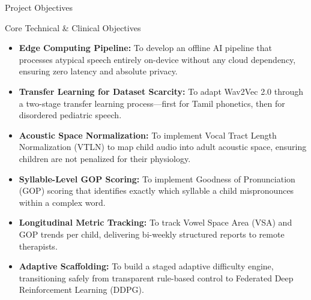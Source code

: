\documentclass[aspectratio=169, 11pt, xcolor=table]{beamer}
\begin{document}
\begin{frame}{Project Objectives}
    \begin{block}{Core Technical \& Clinical Objectives}
        \small
        \begin{itemize}
            \setlength{\itemsep}{6pt}
            \item \textbf{Edge Computing Pipeline:} To develop an offline AI pipeline that processes atypical speech entirely on-device without any cloud dependency, ensuring zero latency and absolute privacy.
            \item \textbf{Transfer Learning for Dataset Scarcity:} To adapt Wav2Vec 2.0 through a two-stage transfer learning process—first for Tamil phonetics, then for disordered pediatric speech.
            \item \textbf{Acoustic Space Normalization:} To implement Vocal Tract Length Normalization (VTLN) to map child audio into adult acoustic space, ensuring children are not penalized for their physiology.
            \item \textbf{Syllable-Level GOP Scoring:} To implement Goodness of Pronunciation (GOP) scoring that identifies exactly which syllable a child mispronounces within a complex word.
            \item \textbf{Longitudinal Metric Tracking:} To track Vowel Space Area (VSA) and GOP trends per child, delivering bi-weekly structured reports to remote therapists.
            \item \textbf{Adaptive Scaffolding:} To build a staged adaptive difficulty engine, transitioning safely from transparent rule-based control to Federated Deep Reinforcement Learning (DDPG).
        \end{itemize}
    \end{block}
\end{frame}
\end{document}
